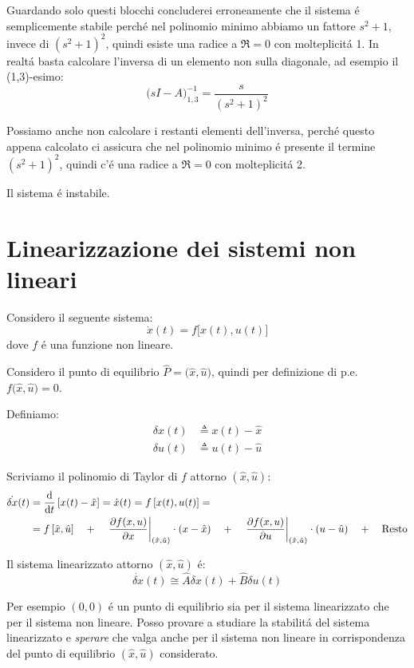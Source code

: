 \documentclass[../main.tex]{subfiles}
\begin{document}
\begin{mdframed}[style=Esempio]
			Guardando solo questi blocchi concluderei erroneamente che il sistema \'e semplicemente stabile perch\'e nel polinomio minimo abbiamo un fattore $ s^2+1 $, invece di $ (s^2+1)^2 $, quindi esiste una radice a $ \Re = 0 $ con molteplicit\'a 1. In realt\'a basta calcolare l'inversa di un elemento non sulla diagonale, ad esempio il (1,3)-esimo:
			\[
				\big( sI-A \big)^{-1}_{1,3} = \dfrac{s}{(s^2+1)^2}
			\]
			
			Possiamo anche non calcolare i restanti elementi dell'inversa, perch\'e questo appena calcolato ci assicura che nel polinomio minimo \'e presente il termine $ (s^2+1)^2 $, quindi c'\'e una radice a $ \Re=0 $ con molteplicit\'a 2.
			
			Il sistema \'e instabile.
		\end{mdframed}
	
	\section{Linearizzazione dei sistemi non lineari}
		Considero il seguente sistema:
		\[
			\dot x(t) = f \big[ x(t), u(t) \big]
		\]
		dove $ f $ \'e una funzione non lineare.
		
		Considero il punto di equilibrio $ \hat P= \big( \hat x, \hat u \big) $, quindi per definizione di p.e. $ f \big( \hat x, \hat u \big) = 0 $.
		
		Definiamo:
		\begin{align*}
			\delta x(t) &\triangleq x(t) - \hat x\\
			\delta u(t) &\triangleq u(t) - \hat u
		\end{align*}
		
		Scriviamo il polinomio di Taylor di $ f $ attorno $ (\hat x, \hat u) $:
		\begin{align*}
			\dot{\delta x}(t) &= \frac{\mathrm{d} }{\mathrm{d} t}\left[ x(t) - \hat x \right] = \dot x(t) = f \left[ x(t), u(t) \right] =
			\\
			&= f \left[ \hat x, \hat u \right] \quad+\quad \left. \frac{\partial f(x,u)}{\partial x} \right|_{(\hat x, \hat u)} \cdot (x - \hat x) \quad+\quad \left. \frac{\partial f(x,u)}{\partial u} \right|_{(\hat x, \hat u)} \cdot (u - \hat u) \quad+\quad \text{Resto}
		\end{align*}
		
		Il sistema linearizzato attorno $ (\hat x, \hat u) $ \'e:
		\[
			\dot{\delta x}(t) \cong \hat A \delta x(t) + \hat B \delta u(t)
		\]
		
		Per esempio $ (0,0) $ \'e un punto di equilibrio sia per il sistema linearizzato che per il sistema non lineare. Posso provare a studiare la stabilit\'a del sistema linearizzato e \textit{sperare} che valga anche per il sistema non lineare in corrispondenza del punto di equilibrio $ (\hat x, \hat u) $ considerato.
		
\end{document}
